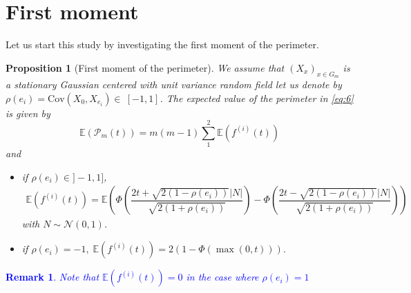 \documentclass[12pt]{article}
\theoremstyle{Theorem}
\newtheorem{Proposition}[Theorem]{Proposition}
\newtheorem{remark}{Remark}
\begin{document}
\section{First moment}
Let us start this study by investigating the first moment of the perimeter.
\begin{Proposition}[First moment of the perimeter] 
\label{propFisrtmoment}
We assume that $\left(X_x \right)_{x \in G_{m}}$ is a stationary Gaussian centered with unit variance random field let us denote \linebreak by  $\rho(e_i) = \text{Cov}\left(X_{\scriptscriptstyle 0}, X_{e_i}\right) \in~[-1, 1]$. The expected value of the perimeter in \eqref{eq:6} is  given \linebreak by $$\mathbb{E}\left(\mathcal{P}_{m}(t)\right) = m(m-1)\sum_{1}^{2}\mathbb{E}\left(f^{(i)}(t) \right)$$  and
\begin{itemize}
  \item if $\rho(e_{i}) \in ]-1,1]$, 
    {\small
  \begin{align}
  \label{propEquationFisrtmoment}
  \mathbb{E}\left(f^{(i)}(t) \right) = \mathbb{E}\left(\Phi\left(\dfrac{2t + \sqrt{2(1-\rho(e_i))}|N|}{\sqrt{2(1+\rho(e_i))}}\right)  - \Phi\left(\dfrac{2t - \sqrt{2(1-\rho(e_i))}|N|}{\sqrt{2(1+\rho(e_i))}}\right)\right)
  \end{align}}
with $N \sim \mathcal{N}(0,1)$. 
\item if $\rho(e_i) = -1, \; \mathbb{E}\left(f^{(i)}(t) \right)= 2\left(1 - \Phi\left(\max\left(0,t\right)\right)\right).$
  \end{itemize}
\end{Proposition}
\textcolor{blue}{\begin{remark}
Note that $\mathbb{E}\left(f^{(i)}(t) \right) = 0$ in the case where $\rho(e_i) = 1$ 
\end{remark}}
\end{document}
